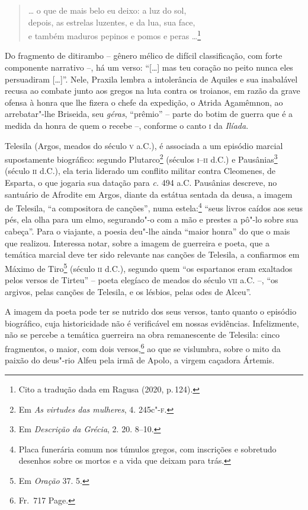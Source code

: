 \begin{verse}
\small{\ldots{} o que de mais belo eu deixo: a luz do sol,\\
 depois, as estrelas luzentes, e da lua, sua face,\\
e também maduros pepinos e pomos e peras \ldots{}}\footnote{Cito a tradução dada em Ragusa (2020, p.\,124).}
\end{verse}

Do fragmento de ditirambo -- gênero mélico de difícil classificação, com forte
componente narrativo --, há um verso: ``[\ldots{}] mas teu coração no peito nunca
eles persuadiram [\ldots{}]”. Nele, Praxila lembra a intolerância de Aquiles e sua
inabalável recusa ao combate junto aos gregos na luta contra os troianos, em razão da
grave ofensa à honra que lhe fizera o chefe da expedição, o Atrida
Agamêmnon, ao arrebatar"-lhe Briseida, seu \textit{géras}, “prêmio” -- parte do
botim de guerra que é a medida da honra de quem o recebe --, conforme o canto \textsc{i}
da \textit{Ilíada}.

Telesila (Argos, meados do século \textsc{v} a.C.), é associada a um episódio marcial
supostamente biográfico: segundo Plutarco\footnote{Em \textit{As
virtudes das mulheres}, 4. 245c"-\textsc{f}.} (séculos \textsc{i}--\textsc{ii} d.C.) e Pausânias\footnote{Em 
\textit{Descrição da Grécia}, 2. 20. 8--10.} (século \textsc{ii} d.C.), ela teria liderado um conflito
militar contra Cleomenes, de Esparta, o que jogaria sua datação para \textit{c.}
494 a.C. Pausânias descreve, no santuário de Afrodite em Argos, diante da
estátua sentada da deusa, a imagem de Telesila, ``a compositora de
canções”, numa estela:\footnote{ Placa funerária comum nos túmulos gregos, com
inscrições e sobretudo desenhos sobre os mortos e a vida que deixam para trás.} ``seus livros caídos aos seus
pés, ela olha para um elmo, segurando"-o com a mão e prestes a pô"-lo sobre sua
cabeça”. Para o viajante, a poesia deu"-lhe ainda ``maior honra” do
que o mais que realizou. Interessa notar, sobre a imagem de guerreira e poeta,
que a temática marcial deve ter sido relevante nas canções de Telesila, a
confiarmos em Máximo de Tiro\footnote{Em \textit{Oração} 37. 5.} (século \textsc{ii} d.C.), segundo
quem ``os espartanos eram exaltados pelos versos de Tirteu” -- 
poeta elegíaco de meados do século \textsc{vii} a.C. --, ``os argivos, pelas
canções de Telesila, e os lésbios, pelas odes de Alceu”. 

A imagem da poeta pode ter se nutrido dos
seus versos, tanto quanto o episódio biográfico, cuja historicidade não
é verificável em nossas evidências.
Infelizmente, não se percebe a temática guerreira na obra
remanescente de Telesila: cinco fragmentos, o maior, com dois versos,\footnote{Fr.~717 Page.} 
ao que se vislumbra, sobre o mito da paixão do deus"-rio Alfeu pela irmã de Apolo,
a virgem caçadora Ártemis.


